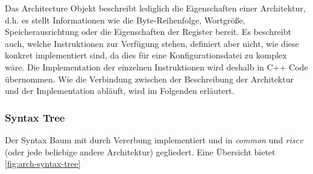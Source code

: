 Das Architecture Objekt beschreibt lediglich die Eigenschaften einer
Architektur, d.h. es stellt Informationen wie die Byte-Reihenfolge, Wortgröße,
Speicherausrichtung oder die Eigenschaften der Register bereit. Es beschreibt
auch, welche Instruktionen zur Verfügung stehen, definiert aber nicht, wie diese
konkret implementiert sind, da dies für eine Konfigurationsdatei zu komplex
wäre. Die Implementation der einzelnen Instruktionen wird deshalb in C++ Code
übernommen. Wie die Verbindung zwischen der Beschreibung der Architektur und der
Implementation abläuft, wird im Folgenden erläutert.

\subsubsection{Syntax Tree}

Der Syntax Baum mit durch Vererbung implementiert und in \emph{common} und
\emph{riscv} (oder jede beliebige andere Architektur) gegliedert. Eine
Übersicht bietet \autoref{fig:arch-syntax-tree}

